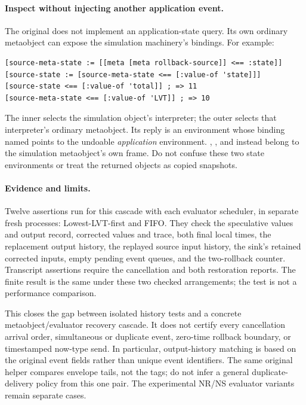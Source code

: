 \paragraph{Inspect without injecting another application event.}
The original  does not implement an application-state
query. Its own ordinary metaobject can expose the simulation machinery's
bindings. For example:

\begin{codeblock}
\begin{lstlisting}
[source-meta-state := [[meta [meta rollback-source]] <== :state]]
[source-state := [source-meta-state <== [:value-of 'state]]]
[source-state <== [:value-of 'total]] ; => 11
[source-meta-state <== [:value-of 'LVT]] ; => 10
\end{lstlisting}
\end{codeblock}

The inner  selects the simulation object's interpreter;
the outer selects that interpreter's ordinary metaobject.
Its  reply is an environment whose binding named
 points to the undoable \emph{application} environment.
, , and  instead belong
to the simulation metaobject's own frame. Do not confuse these two
state environments or treat the returned objects as copied snapshots.

\paragraph{Evidence and limits.}
Twelve assertions run for this cascade with each evaluator scheduler,
in separate fresh processes: Lowest-LVT-first and FIFO. They check
the speculative values and output record, corrected values and trace,
both final local times, the replacement output history, the replayed
source input history, the sink's retained corrected inputs, empty
pending event queues, and the two-rollback counter. Transcript
assertions require the cancellation and both restoration reports.
The finite result is the same under these two checked arrangements;
the test is not a performance comparison.

This closes the gap between isolated history tests and a concrete
metaobject/evaluator recovery cascade. It does not certify every
cancellation arrival order, simultaneous or duplicate event,
zero-time rollback boundary, or timestamped now-type send. In
particular, output-history matching is based on the original event
fields rather than unique event identifiers. The same original
 helper compares envelope tails, not the tags;
do not infer a general duplicate-delivery policy from this one pair.
The experimental NR/NS evaluator variants remain separate cases.

